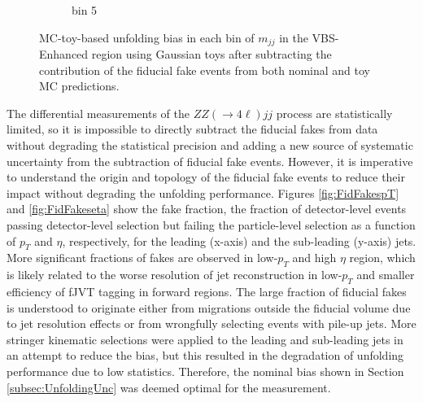 \begin{figure}[htb]
\begin{subfigure}{.48\textwidth}
        \caption{bin 5 }
    \end{subfigure}
    \caption{ MC-toy-based unfolding bias in each bin of $m_{jj}$ in the VBS-Enhanced region using Gaussian toys after subtracting the contribution of the fiducial fake events from both nominal and toy MC predictions.\label{fig:UnfoldingBias_mjj_VBSEnhanced_noFakes}}
\end{figure}

The differential measurements of the $ZZ(\rightarrow 4\ell)jj$ process are statistically limited, so it is impossible to directly subtract the fiducial fakes from data without degrading the statistical precision and adding a new source of systematic uncertainty from the subtraction of fiducial fake events. However, it is imperative to understand the origin and topology of the fiducial fake events to reduce their impact without degrading the unfolding performance. Figures \ref{fig:FidFakespT} and \ref{fig:FidFakeseta} show the fake fraction, the fraction of detector-level events passing detector-level selection but failing the particle-level selection as a function of $p_{T}$ and $\eta$, respectively, for the leading (x-axis) and the sub-leading (y-axis) jets. More significant fractions of fakes are observed in low-$p_{T}$ and high $\eta$ region, which is likely related to the worse resolution of jet reconstruction in low-$p_{T}$ and smaller efficiency of fJVT tagging in forward regions. The large fraction of fiducial fakes is understood to originate either from migrations outside the fiducial volume due to jet resolution effects or from wrongfully selecting events with pile-up jets. More stringer kinematic selections were applied to the leading and sub-leading jets in an attempt to reduce the bias, but this resulted in the degradation of unfolding performance due to low statistics. Therefore, the nominal bias shown in Section \ref{subsec:UnfoldingUnc} was deemed optimal for the measurement. 

